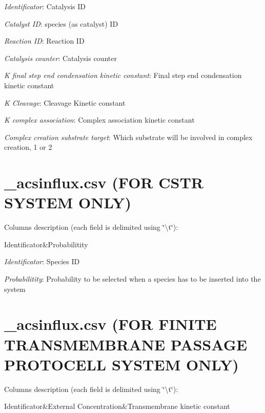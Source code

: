 \begin{DoxyItemize}
\item {\itshape Identificator}\-: Catalysis I\-D
\item {\itshape Catalyst I\-D}\-: species (as catalyst) I\-D
\item {\itshape Reaction I\-D}\-: Reaction I\-D
\item {\itshape Catalysis counter}\-: Catalysis counter
\item {\itshape K final step end condensation kinetic constant}\-: Final step end condensation kinetic constant
\item {\itshape K Cleavage}\-: Cleavage Kinetic constant
\item {\itshape K complex association}\-: Complex association kinetic constant
\item {\itshape Complex creation substrate target}\-: Which substrate will be involved in complex creation, 1 or 2 \par
 
\end{DoxyItemize}\hypertarget{a00004_subInflux}{}\section{\-\_\-acsinflux.\-csv (\-F\-O\-R C\-S\-T\-R S\-Y\-S\-T\-E\-M O\-N\-L\-Y)}\label{a00004_subInflux}
Columns description (each field is delimited using \char`\"{}\textbackslash{}t\char`\"{})\-: \begin{TabularC}{2}
\hline
Identificator&Probabilitity  \\
\end{TabularC}

\begin{DoxyItemize}
\item {\itshape Identificator}\-: Species I\-D
\item {\itshape Probabilitity}\-: Probability to be selected when a species has to be inserted into the system \par
 
\end{DoxyItemize}\hypertarget{a00004_subInfluxBis}{}\section{\-\_\-acsinflux.\-csv (\-F\-O\-R F\-I\-N\-I\-T\-E T\-R\-A\-N\-S\-M\-E\-M\-B\-R\-A\-N\-E P\-A\-S\-S\-A\-G\-E P\-R\-O\-T\-O\-C\-E\-L\-L S\-Y\-S\-T\-E\-M O\-N\-L\-Y)}\label{a00004_subInfluxBis}
Columns description (each field is delimited using \char`\"{}\textbackslash{}t\char`\"{})\-: \begin{TabularC}{3}
\hline
Identificator&External Concentration&Transmembrane kinetic constant  \\
\end{TabularC}

